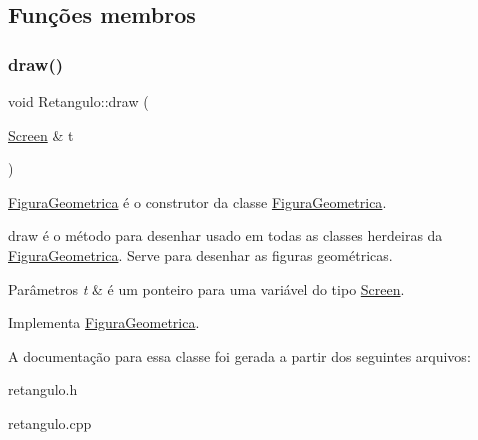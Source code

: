\subsection{Funções membros}
\mbox{\label{class_retangulo_ac088dd6d3f4f3d3f80363a868c2e74f1}} 
\subsubsection{\texorpdfstring{draw()}{draw()}}
{\footnotesize\ttfamily void Retangulo\+::draw (\begin{DoxyParamCaption}\item[{\mbox{\hyperlink{class_screen}{Screen}} \&}]{t }\end{DoxyParamCaption})\hspace{0.3cm}{\ttfamily [virtual]}}



\mbox{\hyperlink{class_figura_geometrica}{Figura\+Geometrica}} é o construtor da classe \mbox{\hyperlink{class_figura_geometrica}{Figura\+Geometrica}}. 

draw é o método para desenhar usado em todas as classes herdeiras da \mbox{\hyperlink{class_figura_geometrica}{Figura\+Geometrica}}. Serve para desenhar as figuras geométricas. 
\begin{DoxyParams}{Parâmetros}
{\em t} & é um ponteiro para uma variável do tipo \mbox{\hyperlink{class_screen}{Screen}}. \\
\hline
\end{DoxyParams}


Implementa \mbox{\hyperlink{class_figura_geometrica_a8ee8dedc060b6059a805ea091aef2c41}{Figura\+Geometrica}}.



A documentação para essa classe foi gerada a partir dos seguintes arquivos\+:\begin{DoxyCompactItemize}
\item 
retangulo.\+h\item 
retangulo.\+cpp\end{DoxyCompactItemize}
